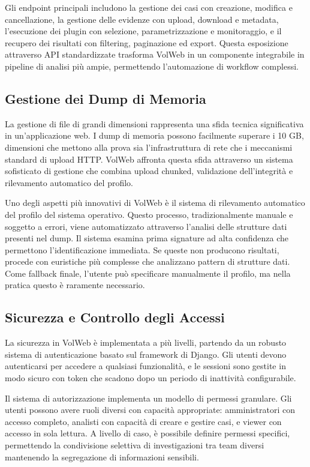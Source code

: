 Gli endpoint principali includono la gestione dei casi con creazione, modifica e cancellazione, la gestione delle evidenze con upload, download e metadata, l'esecuzione dei plugin con selezione, parametrizzazione e monitoraggio, e il recupero dei risultati con filtering, paginazione ed export. Questa esposizione attraverso API standardizzate trasforma VolWeb in un componente integrabile in pipeline di analisi più ampie, permettendo l'automazione di workflow complessi.

\subsection{Gestione dei Dump di Memoria}

La gestione di file di grandi dimensioni rappresenta una sfida tecnica significativa in un'applicazione web. I dump di memoria possono facilmente superare i 10 GB, dimensioni che mettono alla prova sia l'infrastruttura di rete che i meccanismi standard di upload HTTP. VolWeb affronta questa sfida attraverso un sistema sofisticato di gestione che combina upload chunked, validazione dell'integrità e rilevamento automatico del profilo.

Uno degli aspetti più innovativi di VolWeb è il sistema di rilevamento automatico del profilo del sistema operativo. Questo processo, tradizionalmente manuale e soggetto a errori, viene automatizzato attraverso l'analisi delle strutture dati presenti nel dump. Il sistema esamina prima signature ad alta confidenza che permettono l'identificazione immediata. Se queste non producono risultati, procede con euristiche più complesse che analizzano pattern di strutture dati. Come fallback finale, l'utente può specificare manualmente il profilo, ma nella pratica questo è raramente necessario.

\subsection{Sicurezza e Controllo degli Accessi}

La sicurezza in VolWeb è implementata a più livelli, partendo da un robusto sistema di autenticazione basato sul framework di Django. Gli utenti devono autenticarsi per accedere a qualsiasi funzionalità, e le sessioni sono gestite in modo sicuro con token che scadono dopo un periodo di inattività configurabile.

Il sistema di autorizzazione implementa un modello di permessi granulare. Gli utenti possono avere ruoli diversi con capacità appropriate: amministratori con accesso completo, analisti con capacità di creare e gestire casi, e viewer con accesso in sola lettura. A livello di caso, è possibile definire permessi specifici, permettendo la condivisione selettiva di investigazioni tra team diversi mantenendo la segregazione di informazioni sensibili.

